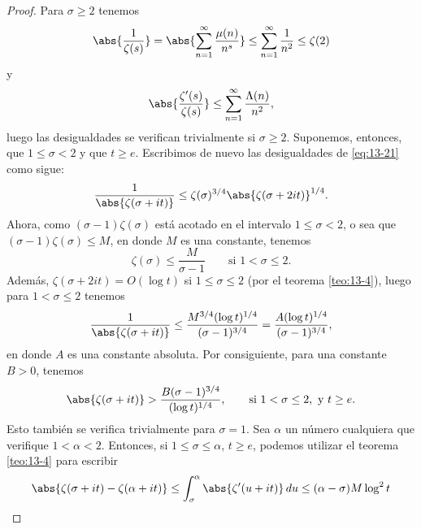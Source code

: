 \documentclass[12pt,a4paper]{book}
\begin{document}
    \begin{proof}
        Para $\sigma\geq2$ tenemos
        \begin{equation*}
            \abs{\frac{1}{\zeta(s)}}=\abs{\sum_{n=1}^{\infty}\frac{\mu(n)}{n^{s}}}\leq\sum_{n=1}^{\infty}\frac{1}{n^{2}}\leq\zeta(2)
        \end{equation*}
        y
        \begin{equation*}
            \abs{\frac{\zeta'(s)}{\zeta(s)}}\leq\sum_{n=1}^{\infty}\frac{\Lambda(n)}{n^{2}},
        \end{equation*}
        luego las desigualdades se verifican trivialmente si $\sigma\geq2$. Suponemos, entonces,
        que $1\leq\sigma<2$ y que $t\geq e$. Escribimos de nuevo las desigualdades de
        \eqref{eq:13-21} como sigue:
        \begin{equation*}
            \frac{1}{\abs{\zeta(\sigma+it)}}\leq\zeta(\sigma)^{3/4}\abs{\zeta(\sigma+2it)}^{1/4}.
        \end{equation*}
        Ahora, como $(\sigma-1)\zeta(\sigma)$ está acotado en el intervalo $1\leq\sigma<2$, o
        sea que $(\sigma-1)\zeta(\sigma)\leq M$, en donde $M$ es una constante, tenemos
        \begin{equation*}
            \zeta(\sigma)\leq\frac{M}{\sigma-1}\qquad\text{si }1<\sigma\leq2.
        \end{equation*}
        Además, $\zeta(\sigma+2it)=O(\log t)$ si $1\leq\sigma\leq2$ (por el teorema
        \ref{teo:13-4}), luego para $1<\sigma\leq2$ tenemos
        \begin{equation*}
            \frac{1}{\abs{\zeta(\sigma+it)}}\leq\frac{M^{3/4}(\log t)^{1/4}}{(\sigma-1)^{3/4}}=\frac{A(\log t)^{1/4}}{(\sigma-1)^{3/4}},
        \end{equation*}
        en donde $A$ es una constante absoluta. Por consiguiente, para una constante $B>0$,
        tenemos
        \begin{equation}\label{eq:13-23}
            \abs{\zeta(\sigma+it)}>\frac{B(\sigma-1)^{3/4}}{(\log t)^{1/4}},\qquad\text{si }1<\sigma\leq2,\text{ y }t\geq e.
        \end{equation}
        Esto también se verifica trivialmente para $\sigma=1$. Sea $\alpha$ un número cualquiera
        que verifique $1<\alpha<2$. Entonces, si $1\leq\sigma\leq\alpha$, $t\geq e$, podemos
        utilizar el teorema \ref{teo:13-4} para escribir
        \begin{align*}
            \abs{\zeta(\sigma+it)-\zeta(\alpha+it)}&\leq\int_{\sigma}^{\alpha}\abs{\zeta'(u+it)}\,du\leq(\alpha-\sigma)M\log^{2}t\\

\end{align*}
\end{proof}
\end{document}
